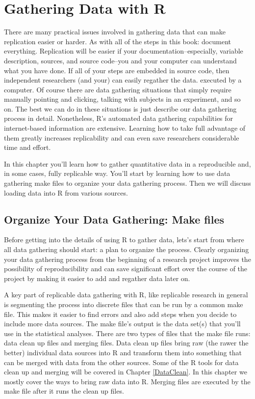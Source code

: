 



\chapter{Gathering Data with R}\label{DataGather}

There are many practical issues involved in gathering data that can make replication easier or harder. As with all of the steps in this book: document everything. Replication will be easier if your documentation--especially, variable description, sources, and source code--you and your computer can understand what you have done. If all of your steps are embedded in source code, then independent researchers (and your) can easily regather the data. executed by a computer. Of course there are data gathering situations that simply require manually pointing and clicking, talking with subjects in an experiment, and so on. The best we can do in these situations is just describe our data gathering process in detail. Nonetheless, R's automated data gathering capabilities for internet-based information are extensive. Learning how to take full advantage of them greatly increases replicability and can even save researchers considerable time and effort.

In this chapter you'll learn how to gather quantitative data in a reproducible and, in some cases, fully replicable way. You'll start by learning how to use data gathering make files to organize your data gathering process. Then we will discuss loading data into R from various sources.

\section{Organize Your Data Gathering: Make files}
Before getting into the details of using R to gather data, lets's start from where all data gathering should start: a plan to organize the process. Clearly organizing your data gathering process from the beginning of a research project improves the possibility of reproducibility and can save significant effort over the course of the project by making it easier to add and regather data later on. 

A key part of replicable data gathering with R, like replicable research in general is segmenting the process into discrete files that can be run by a common make file. This makes it easier to find errors and also add steps when you decide to include more data sources. The make file's output is the data set(s) that you'll use in the statistical analyses. There are two types of files that the make file runs: data clean up files and merging files. Data clean up files bring raw (the rawer the better) individual data sources into R and transform them into something that can be merged with data from the other sources. Some of the R tools for data clean up and merging will be covered in Chapter \ref{DataClean}. In this chapter we mostly cover the ways to bring raw data into R. Merging files are executed by the make file after it runs the clean up files.

